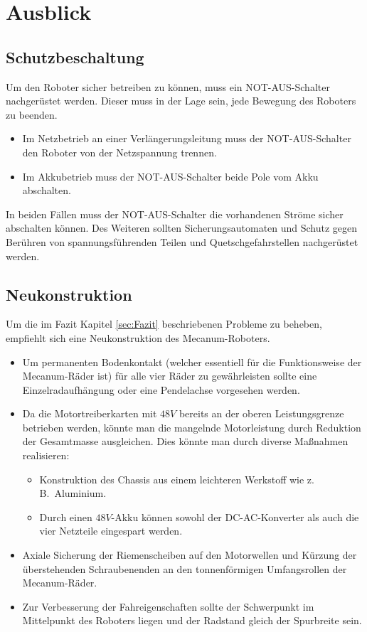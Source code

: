 
\section{Ausblick}
\label{sec:Ausblick}

\subsection{Schutzbeschaltung}
\label{sec:Schutzbeschaltung}
Um den Roboter sicher betreiben zu können, muss ein NOT-AUS-Schalter nachgerüstet werden. Dieser muss in der Lage sein, jede Bewegung des Roboters zu beenden.
\begin{itemize}
\item{Im Netzbetrieb an einer Verlängerungsleitung muss der NOT-AUS-Schalter den Roboter von der Netzspannung trennen.}
\item{Im Akkubetrieb muss der NOT-AUS-Schalter beide Pole vom Akku abschalten.}
\end{itemize}
In beiden Fällen muss der NOT-AUS-Schalter die vorhandenen Ströme sicher abschalten können. Des Weiteren sollten Sicherungsautomaten und Schutz gegen Berühren von spannungsführenden Teilen und Quetschgefahrstellen nachgerüstet werden.

\subsection{Neukonstruktion}
\label{sec:Neukonstruktion}
Um die im Fazit Kapitel \ref{sec:Fazit} beschriebenen Probleme zu beheben, empfiehlt sich eine Neukonstruktion des Mecanum-Roboters.
\begin{itemize}
\item{Um permanenten Bodenkontakt (welcher essentiell für die Funktionsweise der Mecanum-Räder ist) für alle vier Räder zu gewährleisten sollte eine Einzelradaufhängung oder eine Pendelachse vorgesehen werden.}
\item{Da die Motortreiberkarten mit $48V$ bereits an der oberen Leistungsgrenze betrieben werden, könnte man die mangelnde Motorleistung durch Reduktion der Gesamtmasse ausgleichen. Dies könnte man durch diverse Maßnahmen realisieren:
\begin {itemize}
\item{Konstruktion des Chassis aus einem leichteren Werkstoff wie z.\,B.\ Aluminium.}
\item{Durch einen $48V$-Akku können sowohl der DC-AC-Konverter als auch die vier Netzteile eingespart werden.}
\end{itemize}
}
\item{Axiale Sicherung der Riemenscheiben auf den Motorwellen und Kürzung der überstehenden Schraubenenden an den tonnenförmigen Umfangsrollen der Mecanum-Räder.}
\item{Zur Verbesserung der Fahreigenschaften sollte der Schwerpunkt im Mittelpunkt des Roboters liegen und der Radstand gleich der Spurbreite sein.}
\end{itemize}

